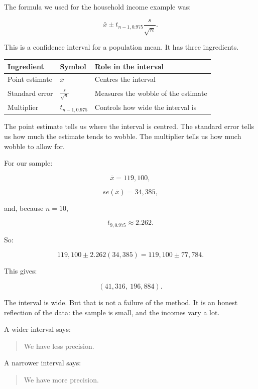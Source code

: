 \documentclass[
  letterpaper,
  DIV=11,
  numbers=noendperiod]{scrreprt}
\begin{document}
The formula we used for the household income example was:

\[
\bar{x}
\pm
t_{n-1,0.975}
\frac{s}{\sqrt{n}}.
\]

This is a confidence interval for a population mean. It has three
ingredients.

\begin{table}
\fontsize{12.0pt}{14.0pt}\selectfont
\begin{tabular*}{\linewidth}{@{\extracolsep{\fill}}lll}
\toprule
Ingredient & Symbol & Role in the interval \\ 
\midrule\addlinespace[2.5pt]
Point estimate & \(\bar{x}\) & Centres the interval \\ 
Standard error & \(\frac{s}{\sqrt{n}}\) & Measures the wobble of the estimate \\ 
Multiplier & \(t_{n-1,0.975}\) & Controls how wide the interval is \\ 
\bottomrule
\end{tabular*}
\end{table}

The point estimate tells us where the interval is centred. The standard
error tells us how much the estimate tends to wobble. The multiplier
tells us how much wobble to allow for.

For our sample:

\[
\bar{x} = 119{,}100,
\]

\[
se(\bar{x}) = 34{,}385,
\]

and, because \(n = 10\),

\[
t_{9,0.975} \approx 2.262.
\]

So:

\[
119{,}100
\pm
2.262(34{,}385)
=
119{,}100
\pm
77{,}784.
\]

This gives:

\[
(41{,}316,\ 196{,}884).
\]

The interval is wide. But that is not a failure of the method. It is an
honest reflection of the data: the sample is small, and the incomes vary
a lot.

A wider interval says:

\begin{quote}
We have less precision.
\end{quote}

A narrower interval says:

\begin{quote}
We have more precision.
\end{quote}
\end{document}
